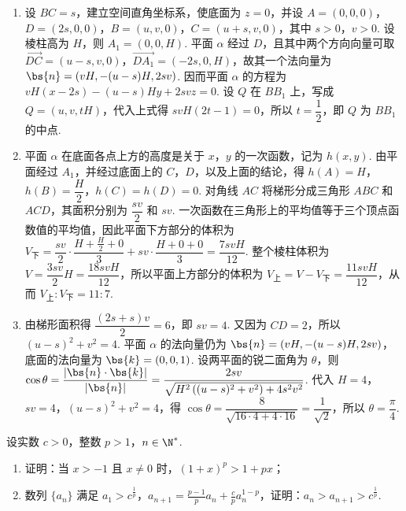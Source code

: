 \begin{solution}
\begin{enumerate}
\item 设 \(BC=s\)，建立空间直角坐标系，使底面为 \(z=0\)，并设 \(A=(0,0,0)\)，\(D=(2s,0,0)\)，\(B=(u,v,0)\)，\(C=(u+s,v,0)\)，其中 \(s>0\)，\(v>0\). 设棱柱高为 \(H\)，则 \(A_{1}=(0,0,H)\). 平面 \(\alpha\) 经过 \(D\)，且其中两个方向向量可取 \(\overrightarrow{DC}=(u-s,v,0)\)，\(\overrightarrow{DA_{1}}=(-2s,0,H)\)，故其一个法向量为 \(\bs{n}=(vH,-(u-s)H,2sv)\). 因而平面 \(\alpha\) 的方程为 \(vH(x-2s)-(u-s)Hy+2svz=0\). 设 \(Q\) 在 \(BB_{1}\) 上，写成 \(Q=(u,v,tH)\)，代入上式得 \(svH(2t-1)=0\)，所以 \(t=\dfrac{1}{2}\)，即 \(Q\) 为 \(BB_{1}\) 的中点.
\item 平面 \(\alpha\) 在底面各点上方的高度是关于 \(x\)，\(y\) 的一次函数，记为 \(h(x,y)\). 由平面经过 \(A_{1}\)，并经过底面上的 \(C\)，\(D\)，以及上面的结论，得 \(h(A)=H\)，\(h(B)=\dfrac{H}{2}\)，\(h(C)=h(D)=0\). 对角线 \(AC\) 将梯形分成三角形 \(ABC\) 和 \(ACD\)，其面积分别为 \(\dfrac{sv}{2}\) 和 \(sv\). 一次函数在三角形上的平均值等于三个顶点函数值的平均值，因此平面下方部分的体积为 \(V_{\text{下}}=\dfrac{sv}{2}\cdot\dfrac{H+\frac{H}{2}+0}{3}+sv\cdot\dfrac{H+0+0}{3}=\dfrac{7svH}{12}\). 整个棱柱体积为 \(V=\dfrac{3sv}{2}H=\dfrac{18svH}{12}\)，所以平面上方部分的体积为 \(V_{\text{上}}=V-V_{\text{下}}=\dfrac{11svH}{12}\)，从而 \(V_{\text{上}}:V_{\text{下}}=11:7\).
\item 由梯形面积得 \(\dfrac{(2s+s)v}{2}=6\)，即 \(sv=4\). 又因为 \(CD=2\)，所以 \((u-s)^{2}+v^{2}=4\). 平面 \(\alpha\) 的法向量仍为 \(\bs{n}=(vH,-(u-s)H,2sv)\)，底面的法向量为 \(\bs{k}=(0,0,1)\). 设两平面的锐二面角为 \(\theta\)，则 \(\cos\theta=\dfrac{|\bs{n}\cdot\bs{k}|}{|\bs{n}|}=\dfrac{2sv}{\sqrt{H^{2}\left((u-s)^{2}+v^{2}\right)+4s^{2}v^{2}}}\). 代入 \(H=4\)，\(sv=4\)，\((u-s)^{2}+v^{2}=4\)，得 \(\cos\theta=\dfrac{8}{\sqrt{16\cdot4+4\cdot16}}=\dfrac{1}{\sqrt{2}}\)，所以 \(\theta=\dfrac{\pi}{4}\).
\end{enumerate}
\end{solution}

\begin{problem}
设实数 \(c > 0\)，整数 \(p > 1\)，\(n \in \N^*\).

\begin{enumerate}
\item 证明：当 \(x > -1\) 且 \(x \neq 0\) 时，\((1 + x)^p > 1 + px\)；
\item 数列 \(\{a_{n}\}\) 满足 \(a_1 > c^{\frac{1}{p}}\)，\(a_{n+1} = \frac{p-1}{p}a_n + \frac{c}{p}a_n^{1-p}\)，证明：\(a_n > a_{n+1} > c^{\frac{1}{p}}\).
\end{enumerate}
\end{problem}

